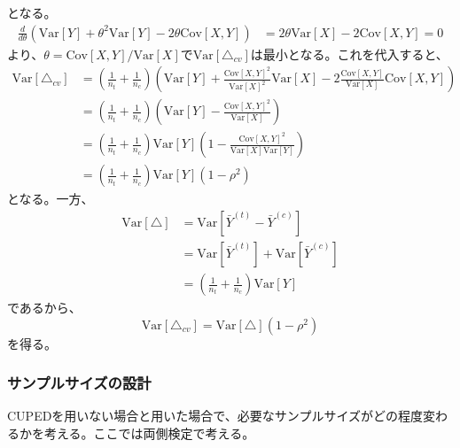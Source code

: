 となる。
\begin{align}
    \frac{d}{d\theta} (\text{Var}[Y] + \theta^{2} \text{Var}[Y] - 2\theta \text{Cov}[X, Y]) & = 2\theta \text{Var}[X] - 2\text{Cov}[X, Y] = 0
\end{align}
より、$\theta = \text{Cov}[X, Y] / \text{Var}[X]$で$\text{Var}[\triangle_{cv}]$は最小となる。これを代入すると、
\begin{align}
    \text{Var}[\triangle_{cv}] & = \left(\frac{1}{n_{t}} + \frac{1}{n_{c}}\right)\left(\text{Var}[Y] + \frac{\text{Cov}[X, Y]^{2}}{\text{Var}[X]^{2}} \text{Var}[X] - 2 \frac{\text{Cov}[X, Y]}{\text{Var}[X]} \text{Cov}[X, Y]\right) \\
                               & = \left(\frac{1}{n_{t}} + \frac{1}{n_{c}}\right)\left(\text{Var}[Y] - \frac{\text{Cov}[X, Y]^{2}}{\text{Var}[X]}\right)                                                                               \\
                               & = \left(\frac{1}{n_{t}} + \frac{1}{n_{c}}\right)\text{Var}[Y]\left(1 - \frac{\text{Cov}[X, Y]^{2}}{\text{Var}[X]\text{Var}[Y]}\right)                                                                 \\
                               & = \left(\frac{1}{n_{t}} + \frac{1}{n_{c}}\right)\text{Var}[Y]\left(1 - \rho^{2}\right)
\end{align}
となる。一方、
\begin{align}
    \text{Var}[\triangle] & = \text{Var}[\bar{Y}^{(t)} - \bar{Y}^{(c)}]                   \\
                          & = \text{Var}[\bar{Y}^{(t)}] + \text{Var}[\bar{Y}^{(c)}]       \\
                          & = \left(\frac{1}{n_{t}} + \frac{1}{n_{c}}\right)\text{Var}[Y]
\end{align}
であるから、
\begin{equation}
    \text{Var}[\triangle_{cv}] = \text{Var}[\triangle](1 - \rho^{2})
\end{equation}
を得る。

\subsubsection{サンプルサイズの設計}

CUPEDを用いない場合と用いた場合で、必要なサンプルサイズがどの程度変わるかを考える。ここでは両側検定で考える。

